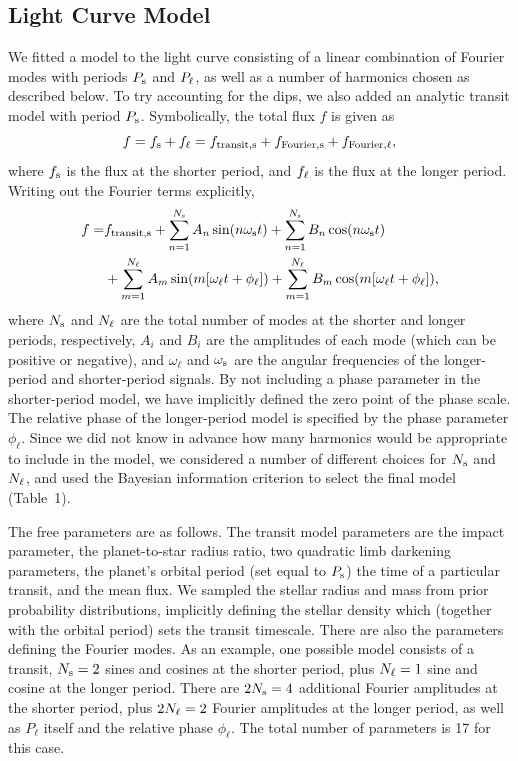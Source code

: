 \documentclass[12pt,twocolumn,tighten]{aastex62}
\begin{document}
\subsection{Light Curve Model}

We fitted a model to the light curve consisting of a linear
combination of Fourier modes with periods $P_{\rm s}$ and $P_{\rm
\ell}$, as well as a number of harmonics chosen as described below. To
try accounting for the dips, we also added an analytic transit model
with period $P_{\rm s}$.  Symbolically, the total flux $f$ is given as
\begin{equation}
  f = f_{\rm s} + f_{\rm \ell}
  = f_{\rm transit,s} + f_{\rm Fourier,s} + f_{\rm Fourier,\ell},
\end{equation}
where $f_{\rm s}$ is the flux at the shorter period, and $f_{\rm
\ell}$ is the flux at the longer period.  Writing out the Fourier
terms explicitly,
\begin{align}
  f = &f_{\rm transit,s} + \sum_{n=1}^{N_{\rm s}} A_n \sin(n\omega_{\rm s}t)
  + \sum_{n=1}^{N_{\rm s}} B_n \cos(n\omega_{\rm s}t)\\
  &+ \sum_{m=1}^{N_{\rm \ell}} A_m \sin(m[\omega_{\rm \ell}t+\phi_{\rm \ell}])
  + \sum_{m=1}^{N_{\rm \ell}} B_m \cos(m[\omega_{\rm \ell}t+\phi_{\rm \ell}]), \nonumber
\end{align}
where $N_{\rm s}$ and $N_{\rm \ell}$ are the total number of modes at
the shorter and longer periods, respectively, $A_i$ and $B_i$ are the
amplitudes of each mode (which can be positive or negative), and
$\omega_\ell$ and $\omega_{\rm s}$ are the angular frequencies of the
longer-period and shorter-period signals. By not including a phase
parameter in the shorter-period model, we have implicitly defined the
zero point of the phase scale. The relative phase of the longer-period
model is specified by the phase parameter $\phi_\ell$.  Since we did
not know in advance how many harmonics would be appropriate to include
in the model, we considered a number of different choices for $N_{\rm
s}$ and $N_{\rm \ell}$, and used the Bayesian information criterion to
select the final model (Table~1).

The free parameters are as follows.  The transit model parameters are
the impact parameter, the planet-to-star radius ratio, two quadratic
limb darkening parameters, the planet's orbital period (set equal to
$P_{\rm s}$) the time of a particular transit, and the mean flux.  We
sampled the stellar radius and mass from prior probability
distributions, implicitly defining the stellar density which (together
with the orbital period) sets the transit timescale.  There are also
the parameters defining the Fourier modes.  As an example, one
possible model consists of a transit, $N_{\rm s}=2$ sines and cosines
at the shorter period, plus $N_{\rm \ell}=1$ sine and cosine at the
longer period.  There are $2N_{\rm s}=4$ additional Fourier amplitudes
at the shorter period, plus $2N_{\rm \ell}=2$ Fourier amplitudes at
the longer period, as well as $P_\ell$ itself and the relative phase
$\phi_\ell$.  The total number of parameters is 17 for this case.
\end{document}
